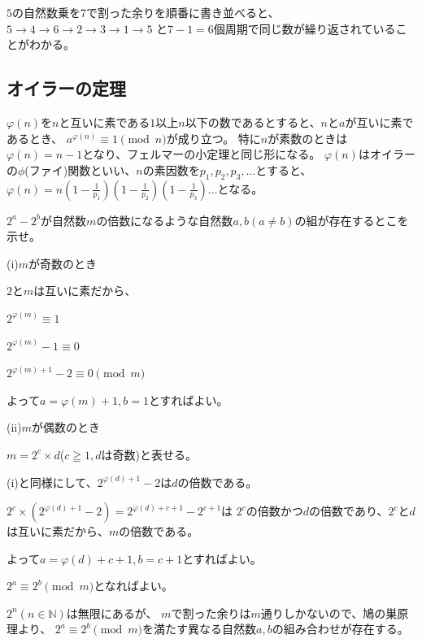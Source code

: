 \documentclass[uplatex,dvipdfmx]{jsbook}
\begin{document}
$5$の自然数乗を7で割った余りを順番に書き並べると、
$5 \rightarrow 4 \rightarrow 6 \rightarrow 2 \rightarrow 3 \rightarrow 1 \rightarrow 5$
と$7-1=6$個周期で同じ数が繰り返されていることがわかる。

\subsection{オイラーの定理}
$\varphi\left(n\right)$を$n$と互いに素である$1$以上$n$以下の数であるとすると、$n$と$a$が互いに素であるとき、
$a^{\varphi\left(n\right)} \equiv 1 \pmod n$が成り立つ。
特に$n$が素数のときは$\varphi\left(n\right)=n-1$となり、フェルマーの小定理と同じ形になる。
$\varphi(n)$はオイラーの$\phi$(ファイ)関数といい、$n$の素因数を$p_1,p_2,p_3,\dots$とすると、
$\displaystyle \varphi(n)=n\left(1-\frac{1}{p_1}\right)\left(1-\frac{1}{p_2}\right)\left(1-\frac{1}{p_3}\right)\dots$となる。

\begin{problem}[練習問題]
    $2^a-2^b$が自然数$m$の倍数になるような自然数$a,b\left(a\neq b\right)$の組が存在するとこを示せ。
\end{problem}

\begin{answer}
    (i)$m$が奇数のとき

    $2$と$m$は互いに素だから、

    $2^{\varphi\left(m\right)} \equiv 1$

    $2^{\varphi\left(m\right)}-1 \equiv 0$

    $2^{\varphi\left(m\right)+1}-2 \equiv 0\pmod m$

    よって$a=\varphi\left(m\right)+1,b=1$とすればよい。

    (i\hspace{-1pt}i)$m$が偶数のとき

    $m=2^c\times d$($c\geqq 1,d$は奇数)と表せる。

    (i)と同様にして、$2^{\varphi\left(d\right)+1}-2$は$d$の倍数である。

    $2^c\times\left(2^{\varphi\left(d\right)+1}-2\right)=2^{\varphi\left(d\right)+c+1}-2^{c+1}$は
    $2^c$の倍数かつ$d$の倍数であり、$2^c$と$d$は互いに素だから、$m$の倍数である。

    よって$a=\varphi\left(d\right)+c+1,b=c+1$とすればよい。
\end{answer}

\begin{answer}[別解]
    $2^a\equiv 2^b \pmod m$となればよい。

    $2^n\left(n\in\mathbb{N}\right)$は無限にあるが、
    $m$で割った余りは$m$通りしかないので、鳩の巣原理より、
    $2^a\equiv 2^b \pmod m$を満たす異なる自然数$a,b$の組み合わせが存在する。
\end{answer}
\end{document}
